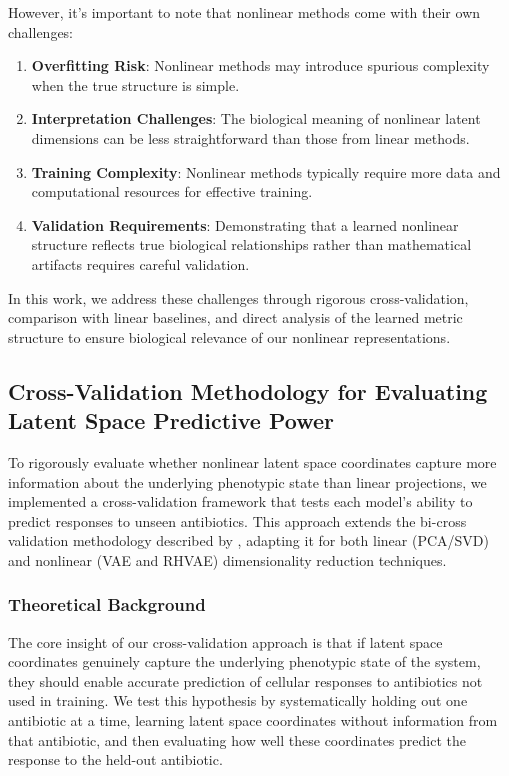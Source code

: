 \documentclass[
]{scrartcl}
\begin{document}
\begin{refsection}
However, it's important to note that nonlinear methods come with their
own challenges:

\begin{enumerate}
\def\labelenumi{\arabic{enumi}.}
\item
  \textbf{Overfitting Risk}: Nonlinear methods may introduce spurious
  complexity when the true structure is simple.
\item
  \textbf{Interpretation Challenges}: The biological meaning of
  nonlinear latent dimensions can be less straightforward than those
  from linear methods.
\item
  \textbf{Training Complexity}: Nonlinear methods typically require more
  data and computational resources for effective training.
\item
  \textbf{Validation Requirements}: Demonstrating that a learned
  nonlinear structure reflects true biological relationships rather than
  mathematical artifacts requires careful validation.
\end{enumerate}

In this work, we address these challenges through rigorous
cross-validation, comparison with linear baselines, and direct analysis
of the learned metric structure to ensure biological relevance of our
nonlinear representations.

\subsection{Cross-Validation Methodology for Evaluating Latent Space
Predictive
Power}\label{cross-validation-methodology-for-evaluating-latent-space-predictive-power}

To rigorously evaluate whether nonlinear latent space coordinates
capture more information about the underlying phenotypic state than
linear projections, we implemented a cross-validation framework that
tests each model's ability to predict responses to unseen antibiotics.
This approach extends the bi-cross validation methodology described by
\textcite{kinsler2020}, adapting it for both linear (PCA/SVD) and
nonlinear (VAE and RHVAE) dimensionality reduction techniques.

\subsubsection{Theoretical Background}\label{theoretical-background}

The core insight of our cross-validation approach is that if latent
space coordinates genuinely capture the underlying phenotypic state of
the system, they should enable accurate prediction of cellular responses
to antibiotics not used in training. We test this hypothesis by
systematically holding out one antibiotic at a time, learning latent
space coordinates without information from that antibiotic, and then
evaluating how well these coordinates predict the response to the
held-out antibiotic.


\end{refsection}
\end{document}
